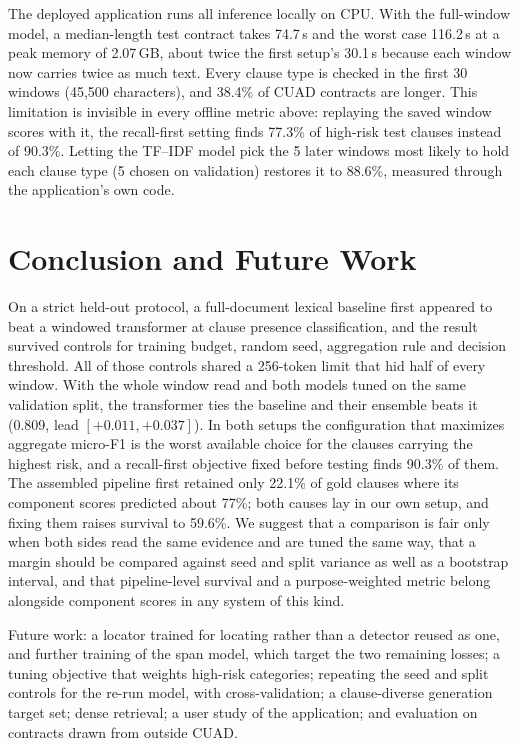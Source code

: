 \documentclass[journal]{IEEEtran}
\begin{document}
The deployed application runs all inference locally on CPU. With the full-window model, a
median-length test contract takes 74.7\,s and the worst case 116.2\,s at a peak memory of 2.07\,GB,
about twice the first setup's 30.1\,s because each window now carries twice as much text. Every clause type is checked in the first 30 windows (45,500 characters), and 38.4\% of CUAD
contracts are longer. This limitation is invisible in every offline metric above: replaying the saved
window scores with it, the recall-first setting finds 77.3\% of high-risk test clauses instead of
90.3\%. Letting the TF--IDF model pick the 5 later windows most likely to hold each clause type (5
chosen on validation) restores it to 88.6\%, measured through the application's own code.

\section{Conclusion and Future Work}
On a strict held-out protocol, a full-document lexical baseline first appeared to beat a windowed
transformer at clause presence classification, and the result survived controls for training
budget, random seed, aggregation rule and decision threshold. All of those controls shared a
256-token limit that hid half of every window. With the whole window read and both models tuned on
the same validation split, the transformer ties the baseline and their ensemble beats it (0.809,
lead $[+0.011,+0.037]$). In both setups the configuration that maximizes aggregate micro-F1 is the
worst available choice for the clauses carrying the highest risk, and a recall-first objective
fixed before testing finds 90.3\% of them. The assembled pipeline first retained only 22.1\% of gold clauses where its component scores
predicted about 77\%; both causes lay in our own setup, and fixing them raises survival to 59.6\%. We suggest that a comparison is fair only
when both sides read the same evidence and are tuned the same way, that a margin should be compared
against seed and split variance as well as a bootstrap interval, and that pipeline-level survival
and a purpose-weighted metric belong alongside component scores in any system of this kind.

Future work: a locator trained for locating rather than a detector reused as one, and further
training of the span model, which target the two remaining losses; a tuning objective that weights high-risk categories; repeating the seed and split controls
for the re-run model, with cross-validation; a clause-diverse generation target set; dense retrieval;
a user study of the application; and evaluation on contracts drawn from outside CUAD.
\end{document}

